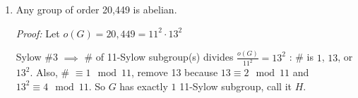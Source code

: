 \begin{enumerate}
    \noindent So $\langle x \rangle = G$. \steezybreak

    \noindent $\therefore \ \ G$ is cyclic. \\
    So any group of order $15$ is cyclic. If $o(G)=o(\bar{G})=15$ then $G$ and $\bar{G}$ are
    isomorphic because any 2 cyclic groups of the same order are isomorphic (important fact right
    before the 1st Isomorphism Theorem). $\ \ \ \ \blacksquare$
    \item Any group of order 20,449 is abelian. \steezybreak

    \noindent \textit{Proof:} Let $o(G)=20,449=11^2\cdot 13^2$ \steezybreak

    \noindent Sylow \#3 $\implies$ \# of 11-Sylow subgroup(s) divides $\frac{o(G)}{11^2}=13^2$ : \#
    is $1$, $13$, or $13^2$. Also, \# $\equiv 1 \mod 11$, remove 13 because $13\equiv 2\mod 11$ and
    $13^2\equiv 4\mod 11$. So $G$ has exactly $1$ 11-Sylow subgroup, call it $H$. \steezybreak


\end{enumerate}
